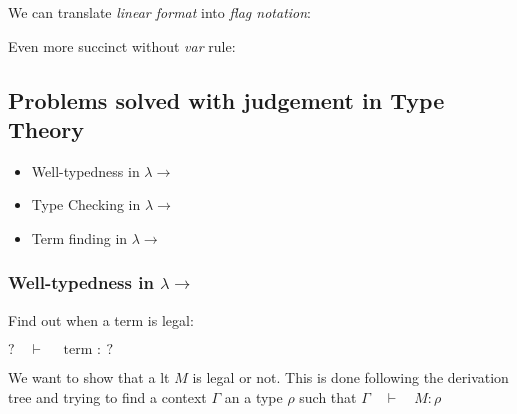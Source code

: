 \documentclass[12pt, a4paper]{article}
\newcommand{\deriv}{\quad\vdash\quad}
\begin{document}
We can translate \textit{linear format} into \textit{flag notation}:

\begin{flagderiv}
  \end{flagderiv}

Even more succinct without \textit{var} rule:

\begin{flagderiv}
  \end{flagderiv}

\subsection{Problems solved with judgement in Type Theory}

\begin{itemize}
    \item Well-typedness in $\lambda\to$
    \item Type Checking in $\lambda\to$
    \item Term finding in $\lambda\to$
\end{itemize}

\subsubsection{Well-typedness in \texorpdfstring{$\lambda\to$}{Lg}}
Find out when a term is legal: 

$ ? \deriv \text{ term } :\ ?$ 

We want to show that a \acrshort{lt} $M$ is legal or not. This is done following the derivation tree and 
trying to find a context $\Gamma$ an a type $\rho$ such that $\Gamma \deriv M : \rho$
\end{document}
